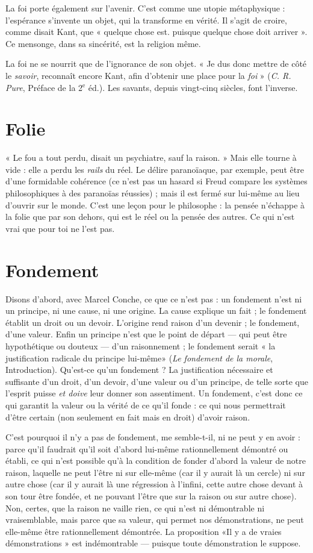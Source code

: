 La foi porte également sur l'avenir. C’est comme une utopie métaphysique :
l’espérance s’invente un objet, qui la transforme en vérité. Il s’agit de
croire, comme disait Kant, que « quelque chose est. puisque quelque chose
doit arriver ». Ce mensonge, dans sa sincérité, est la religion même.

La foi ne se nourrit que de l’ignorance de son objet. « Je dus donc mettre
de côté le {\it savoir}, reconnaît encore Kant, afin d’obtenir une place pour la {\it foi} »
({\it C. R. Pure}, Préface de la 2$^\text{e}$ éd.). Les savants, depuis vingt-cinq siècles, font
l'inverse.

\section{Folie}
« Le fou a tout perdu, disait un psychiatre, sauf la raison. » Mais elle
tourne à vide : elle a perdu les {\it rails} du réel. Le délire paranoïaque,
par exemple, peut être d’une formidable cohérence (ce n’est pas un hasard si
Freud compare les systèmes philosophiques à des paranoïas réussies) ; mais il
est fermé sur lui-même au lieu d’ouvrir sur le monde. C’est une leçon pour le
philosophe : la pensée n’échappe à la folie que par son dehors, qui est le réel ou
la pensée des autres. Ce qui n’est vrai que pour toi ne l’est pas.

\section{Fondement}
Disons d’abord, avec Marcel Conche, ce que ce n’est pas :
un fondement n’est ni un principe, ni une cause, ni une origine.
La cause explique un fait ; le fondement établit un droit ou un devoir.
L'origine rend raison d’un devenir ; le fondement, d’une valeur. Enfin un principe
n’est que le point de départ — qui peut être hypothétique ou douteux —
d’un raisonnement ; le fondement serait « la justification radicale du principe
lui-même» ({\it Le fondement de la morale}, Introduction). Qu'est-ce qu’un
fondement ? La justification nécessaire et suffisante d’un droit, d’un devoir,
d’une valeur ou d’un principe, de telle sorte que l'esprit puisse {\it et doive} leur
donner son assentiment. Un fondement, c’est donc ce qui garantit la valeur ou
la vérité de ce qu’il fonde : ce qui nous permettrait d’être certain (non seulement
en fait mais en droit) d’avoir raison.

C’est pourquoi il n’y a pas de fondement, me semble-t-il, ni ne peut y en
avoir : parce qu’il faudrait qu’il soit d’abord lui-même rationnellement
démontré ou établi, ce qui n’est possible qu’à la condition de fonder d’abord la
valeur de notre raison, laquelle ne peut l'être ni sur elle-même (car il y aurait là
un cercle) ni sur autre chose (car il y aurait là une régression à l’infini, cette
autre chose devant à son tour être fondée, et ne pouvant l’être que sur la raison
ou sur autre chose). Non, certes, que la raison ne vaille rien, ce qui n’est ni
démontrable ni vraisemblable, mais parce que sa valeur, qui permet nos
démonstrations, ne peut elle-même être rationnellement démontrée. La proposition
«Il y a de vraies démonstrations » est indémontrable — puisque toute
démonstration le suppose.

